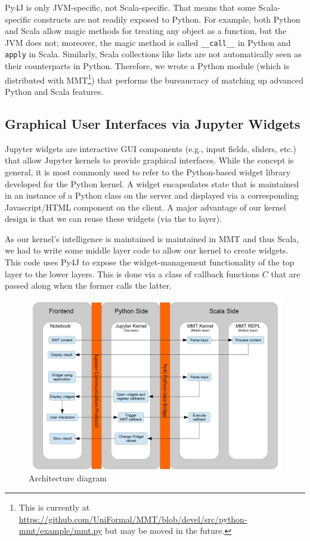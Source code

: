 Py4J is only JVM-specific, not Scala-specific.
That means that some Scala-specific constructs are not readily exposed to Python.
For example, both Python and Scala allow magic methods for treating any object as a function, but the JVM does not; moreover, the magic method is called \texttt{\_\_call\_\_} in Python and \texttt{apply} in Scala.
Similarly, Scala collections like lists are not automatically seen as their counterparts in Python.
Therefore, we wrote a Python module (which is distributed with MMT\footnote{This is currently at \url{https://github.com/UniFormal/MMT/blob/devel/src/python-mmt/example/mmt.py} but may be moved in the future.}) that performs the bureaucracy of matching up advanced Python and Scala features.


\subsection{Graphical User Interfaces via Jupyter Widgets}

Jupyter widgets are interactive GUI components (e.g., input fields, sliders, etc.) that allow Jupyter kernels to provide graphical interfaces.
While the concept is general, it is most commonly used to refer to the Python-based widget library developed for the Python kernel.
A widget encapsulates state that is maintained in an instance of a Python class on the server and displayed via a corresponding Javascript/HTML component on the client.
A major advantage of our kernel design is that we can reuse these widgets (via the to layer).

As our kernel's intelligence is maintained is maintained in MMT and thus Scala, we had to write some middle layer code to allow our kernel to create widgets.
This code uses Py4J to expose the widget-management functionality of the top layer to the lower layers.
This is done via a class of callback functions $C$ that are passed along when the former calls the latter.

\begin{figure}[ht]\centering
  \includegraphics[width=12cm]{ArchitectureDiagram}
  \caption{Architecture diagram}\label{fig:architecture-diagram}
\end{figure}

